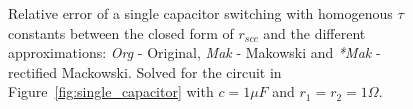 \begin{figure}[!h]
\newcommand\pHeigh{3.25cm}
\newcommand\pWidth{4.5cm}
\centering
    \begin{subfigure}{\textwidth}
       \parbox[b]{.45\linewidth}{
            \raggedright
            \newcommand\dutyCycle{10}
            \newcommand\uDx{1.74}
            
        }
       \parbox[b]{.45\linewidth}{
            \raggedleft
            \newcommand\dutyCycle{23}
            \newcommand\uDx{2.12}
            
        }
    \end{subfigure}

    \begin{subfigure}{\textwidth}
       \parbox[b]{.45\linewidth}{
            \raggedright
            \newcommand\dutyCycle{36}
            \newcommand\uDx{2.43}
            
        }
       \parbox[b]{.45\linewidth}{
            \raggedleft
            \newcommand\dutyCycle{50}
            \newcommand\uDx{2.54}
            
        }
    \end{subfigure}


\caption[Different approximations methods for $r_{scc}$ scenario I]{Relative error of a single capacitor switching with homogenous $\tau$ constants  between the closed form of $r_{scc}$ and the different approximations: \emph{Org} - Original, \emph{Mak} - Makowski and \emph{*Mak} - rectified Mackowski.  Solved for the circuit in Figure~\ref{fig:single_capacitor} with $c=1\mu F$ and $r_1=r_2=1\Omega$.}
\label{fig:rscc_aprox_homo}
\end{figure}
